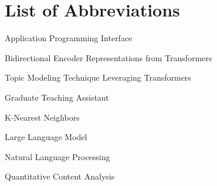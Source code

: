 
\chapter*{List of Abbreviations}

\begin{description}[leftmargin=1.5in, style=multiline]
  \item[API] Application Programming Interface
  \item[BERT] Bidirectional Encoder Representations from Transformers
  \item[BERTopic] Topic Modeling Technique Leveraging Transformers
  \item[GTA] Graduate Teaching Assistant
  \item[KNN] K-Nearest Neighbors
  \item[LLM] Large Language Model
  \item[NLP] Natural Language Processing
  \item[QCA] Quantitative Content Analysis
\end{description}

\newpage